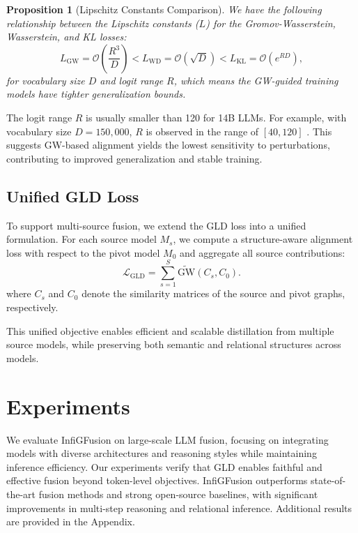 \documentclass{article}
\newtheorem{proposition}{Proposition}
\begin{document}
\begin{proposition}[Lipschitz Constants Comparison]
\label{proposition2}
We have the following relationship between the Lipschitz constants ($L$) for the Gromov-Wasserstein, Wasserstein, and KL losses:
\begin{equation}
L_{\text{GW}} = \mathcal{O}\left(\frac{R^3}{D}\right) < L_{\text{WD}} = \mathcal{O}(\sqrt{D}) < L_{\text{KL}} = \mathcal{O}(e^{RD}),
\end{equation}
for vocabulary size $D$ and logit range $R$, which means the GW-guided training models have tighter generalization bounds.
\end{proposition}

The logit range $R$ is usually smaller than 120 for 14B LLMs. For example, with vocabulary size $D = 150,000$, $R$ is observed in the range of $[40, 120]$ \cite{huggingfaceoutputs}. This suggests GW-based alignment yields the lowest sensitivity to perturbations, contributing to improved generalization and stable training.


\subsection{Unified GLD Loss}

To support multi-source fusion, we extend the GLD loss into a unified formulation. For each source model $M_s$, we compute a structure-aware alignment loss with respect to the pivot model $M_0$ and aggregate all source contributions:
\begin{equation}
\mathcal{L}_{\text{GLD}} = \sum_{s=1}^{S} \widetilde{\text{GW}}(C_s, C_0).
\end{equation}
where $C_s$ and $C_0$ denote the similarity matrices of the source and pivot graphs, respectively.

This unified objective enables efficient and scalable distillation from multiple source models, while preserving both semantic and relational structures across models.

\section{Experiments}
\label{experimentssection}
We evaluate InfiGFusion on large-scale LLM fusion, focusing on integrating models with diverse architectures and reasoning styles while maintaining inference efficiency. Our experiments verify that GLD enables faithful and effective fusion beyond token-level objectives. InfiGFusion outperforms state-of-the-art fusion methods and strong open-source baselines, with significant improvements in multi-step reasoning and relational inference. Additional results are provided in the Appendix.
\end{document}
